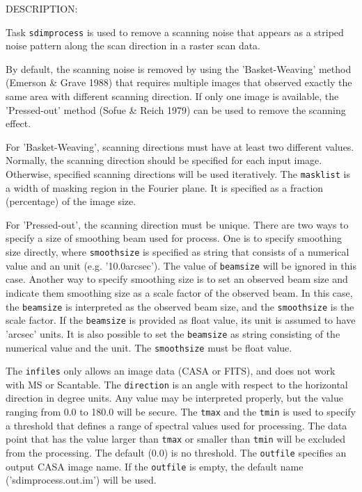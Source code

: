  DESCRIPTION:

Task {\tt sdimprocess} is used to remove a scanning noise that appears 
as a striped noise pattern along the scan direction in a raster 
scan data. 

By default, the scanning noise is removed by using the 
'Basket-Weaving' method (Emerson \& Grave 1988) that requires 
multiple images that observed exactly the same area with different 
scanning direction. If only one image is available, the 'Pressed-out' 
method (Sofue \& Reich 1979) can be used to remove the scanning effect.

For 'Basket-Weaving', scanning directions must have at least two 
different values. Normally, the scanning direction should be 
specified for each input image. Otherwise, specified scanning 
directions will be used iteratively. The {\tt masklist} is a width of 
masking region in the Fourier plane. It is specified as a fraction 
(percentage) of the image size. 

For 'Pressed-out', the scanning direction must be unique. There are 
two ways to specify a size of smoothing beam used for process. One 
is to specify smoothing size directly, where {\tt smoothsize} is specified
as string that consists of a numerical value and an unit 
(e.g. '10.0arcsec'). The value of {\tt beamsize} will be ignored in this case. 
Another way to specify smoothing size is to set an observed beam size 
and indicate them smoothing size as a scale factor of the observed beam.
In this case, the {\tt beamsize} is interpreted as the observed beam 
size, and the {\tt smoothsize} is the scale factor. If the {\tt beamsize} is 
provided as float value, its unit is assumed to have 'arcsec' units. It is also 
possible to set the {\tt beamsize} as string consisting of the numerical 
value and the unit. The {\tt smoothsize} must be float value.

The {\tt infiles} only allows an image data (CASA or FITS), and does
not work with MS or Scantable. The {\tt direction} is an angle with respect 
to the horizontal direction in degree units. Any value may be 
interpreted properly, but the value ranging from 0.0 to 180.0 will be 
secure. The {\tt tmax} and the {\tt tmin} is used to specify a threshold that 
defines a range of spectral values used for processing. The data point 
that has the value larger than {\tt tmax} or smaller than {\tt tmin} will be 
excluded from the processing. The default (0.0) is no threshold. 
The {\tt outfile} specifies an output CASA image name. If the {\tt outfile} 
is empty, the default name ('sdimprocess.out.im') will be used. 


